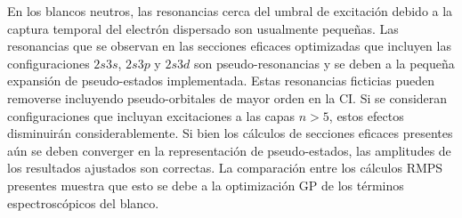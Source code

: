 En los blancos neutros, las resonancias cerca del umbral de excitación 
debido a la captura temporal del electrón dispersado son usualmente 
pequeñas. Las resonancias que se observan en las secciones 
eficaces optimizadas que incluyen las configuraciones $2s3s$, $2s3p$ y 
$2s3d$ son pseudo-resonancias y se deben a la pequeña expansión de 
pseudo-estados implementada. Estas resonancias ficticias pueden 
removerse incluyendo pseudo-orbitales de mayor orden en la CI. Si se 
consideran configuraciones que incluyan excitaciones a las capas $n>5$, 
estos efectos disminuirán considerablemente. 
Si bien los cálculos de secciones eficaces presentes aún se deben 
converger en la representación de pseudo-estados, las amplitudes de los 
resultados ajustados son correctas. La comparación entre los cálculos 
RMPS presentes muestra que esto se debe a la optimización GP de los 
términos espectroscópicos del blanco. 



